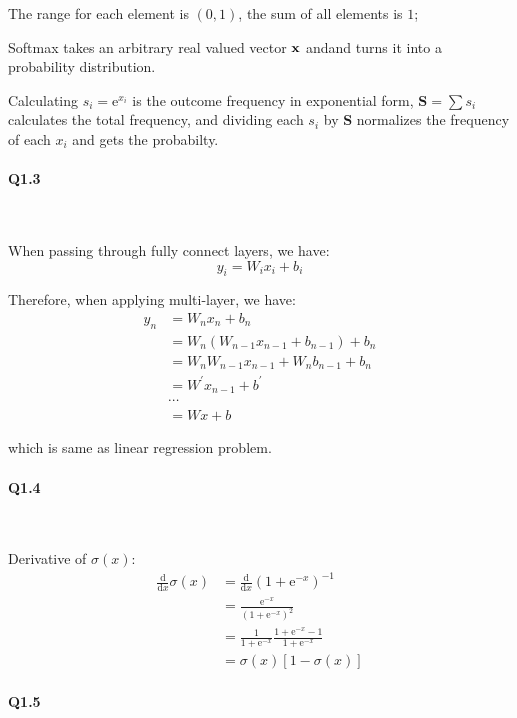 \documentclass[11pt]{article} \usepackage{fullpage} \usepackage{graphicx} \usepackage{epstopdf} \usepackage{color} \usepackage{psfrag} \usepackage{pdfsync}\usepackage{indentfirst}\usepackage{subfigure}\usepackage{float}\usepackage[section]{placeins}
\begin{document}
The range for each element is $\left(0, 1\right)$, the sum of all elements is $1$;

Softmax takes an arbitrary real valued vector $\bold{x}$ andand turns it into a probability distribution.

Calculating $s_i = \mathrm{e}^{x_i}$ is the outcome frequency in exponential form, $\mathbf{S} = \sum s_i$ calculates the total frequency, and dividing each $s_i$ by $\mathbf{S}$ normalizes the frequency of each $x_i$ and gets the probabilty.

\paragraph{Q1.3}~{}

When passing through fully connect layers, we have:
\begin{equation}
	y_i = W_ix_i + b_i
\end{equation}

Therefore, when applying multi-layer, we have:
\begin{align}
	y_n & = W_nx_n + b_n \\
	& = W_n\left(W_{n-1}x_{n-1} + b_{n-1}\right) + b_n \\
	& = W_nW_{n-1}x_{n-1} + W_nb_{n-1} + b_n \\
	& = W^\prime x_{n-1} + b^\prime \\
	& \cdots \\
	& = Wx + b
\end{align}

which is same as linear regression problem.

\paragraph{Q1.4}~{}

Derivative of $\sigma\left(x\right)$:
\begin{align}
	\frac{\mathrm{d}}{\mathrm{d}x}\sigma(x) & = \frac{\mathrm{d}}{\mathrm{d}x}\left(1 + \mathrm{e}^{-x}\right)^{-1} \\
	& = \frac{\mathrm{e}^{-x}}{\left(1+\mathrm{e}^{-x}\right)^{2}} \\
	& = \frac{1}{1+\mathrm{e}^{-x}}\frac{1+\mathrm{e}^{-x}-1}{1+\mathrm{e}^{-x}} \\
	& = \sigma(x) \left[1 - \sigma(x)\right]
\end{align}

\paragraph{Q1.5}~{}
\end{document}
